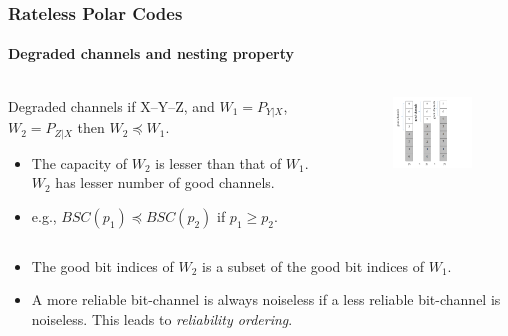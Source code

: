 \documentclass[xcolor=dvipsnames]{beamer}
\begin{document}
\begin{frame}[label = dgnest]
\frametitle{Rateless Polar Codes}
\framesubtitle{Degraded channels and nesting property}
\begin{columns}
\begin{column}{0.6\textwidth}
\begin{block}{Degraded channels} 
if X\---Y\---Z, and $W_1=P_{Y|X}$, $W_2=P_{Z|X}$ then $W_2 \preceq W_1$.
\end{block}
\begin{itemize}
\item The capacity of $W_2$ is lesser than that of $W_1$. $W_2$ has lesser number of good channels.
\item e.g., $BSC(p_1) \preceq BSC(p_2)$ if $p_1 \geq p_2$.
\end{itemize}
\end{column}
\begin{column}{0.3\textwidth}
\begin{figure}
\centering
\includegraphics[width=5cm]{./relorder.png}
\end{figure}
\end{column}
\end{columns}
\begin{itemize}
\item The good bit indices of $W_2$ is a subset of the good bit indices of $W_1$.
\item  A more reliable bit-channel is always noiseless if a less reliable bit-channel is noiseless. This leads to \emph{reliability ordering}.
\end{itemize}
\end{frame}
\end{document}
